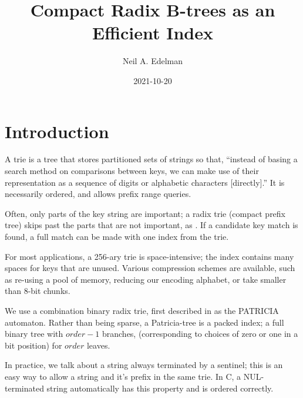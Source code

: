 \documentclass[12pt]{article}
\author{Neil A. Edelman}
\title{Compact Radix B-trees as an Efficient Index}
\date{2021-10-20}
\begin{document}
\maketitle


\section{Introduction}

A trie is a tree that stores partitioned sets of strings\cite{de1959file, fredkin1960trie, jacquet1991analysis, askitis2011redesigning} so that, ``instead of basing a search method on comparisons between keys, we can make use of their representation as a sequence of digits or alphabetic characters [directly].\cite{knuth1997sorting}'' It is necessarily ordered, and allows prefix range queries.

Often, only parts of the key string are important; a radix trie (compact prefix tree) skips past the parts that are not important, as \cite{askitis2007hat}. If a candidate key match is found, a full match can be made with one index from the trie.

For most applications, a 256-ary trie is space-intensive; the index contains many spaces for keys that are unused. Various compression schemes are available, such as re-using a pool of memory\cite{de1959file}, reducing our encoding alphabet, or take smaller than 8-bit chunks\cite{fredkin1960trie}.

We use a combination binary radix trie, first described in \cite{morrison1968patricia} as the PATRICIA automaton. Rather than being sparse, a Patricia-tree is a packed index; a full binary tree with $order - 1$ branches, (corresponding to choices of zero or one in a bit position) for $order$ leaves.

In practice, we talk about a string always terminated by a sentinel; this is an easy way to allow a string and it's prefix in the same trie\cite{morrison1968patricia}. In C, a NUL-terminated string automatically has this property and is ordered correctly.
\end{document}
